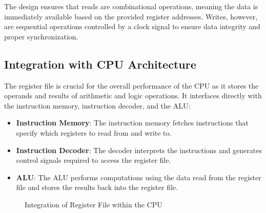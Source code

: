 The design ensures that reads are combinational operations, meaning the data is immediately available based on the provided register addresses. Writes, however, are sequential operations controlled by a clock signal to ensure data integrity and proper synchronization.

\subsection{Integration with CPU Architecture}
The register file is crucial for the overall performance of the CPU as it stores the operands and results of arithmetic and logic operations. It interfaces directly with the instruction memory, instruction decoder, and the ALU:
\begin{itemize}
    \item \textbf{Instruction Memory}: The instruction memory fetches instructions that specify which registers to read from and write to.
    \item \textbf{Instruction Decoder}: The decoder interprets the instructions and generates control signals required to access the register file.
    \item \textbf{ALU}: The ALU performs computations using the data read from the register file and stores the results back into the register file.
\end{itemize}

\begin{figure}[h]
\centering
\hspace*{2cm} %
\caption{Integration of Register File within the CPU}
\end{figure}

